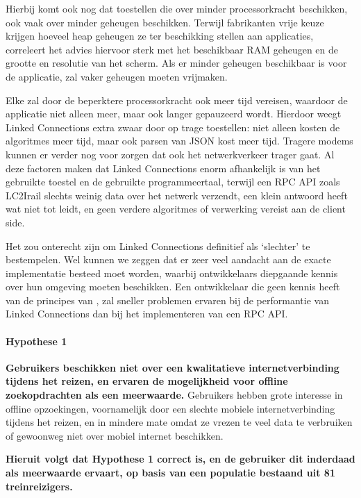 Hierbij komt ook nog dat toestellen die over minder processorkracht beschikken, ook vaak over minder geheugen beschikken. Terwijl fabrikanten vrije keuze krijgen hoeveel heap geheugen ze ter beschikking stellen aan applicaties, correleert het advies hiervoor sterk met het beschikbaar RAM geheugen en de grootte en resolutie van het scherm. Als er minder geheugen beschikbaar is voor de applicatie, zal  vaker geheugen moeten vrijmaken. 

Elke  zal door de beperktere processorkracht ook meer tijd vereisen, waardoor de applicatie niet alleen meer, maar ook langer gepauzeerd wordt. Hierdoor weegt Linked Connections extra zwaar door op trage toestellen: niet alleen kosten de algoritmes meer tijd, maar ook parsen van JSON kost meer tijd. Tragere modems kunnen er verder nog voor zorgen dat ook het netwerkverkeer trager gaat. Al deze factoren maken dat Linked Connections enorm afhankelijk is van het gebruikte toestel en de gebruikte programmeertaal, terwijl een RPC API zoals LC2Irail slechts weinig data over het netwerk verzendt, een klein antwoord heeft wat niet tot  leidt, en geen verdere algoritmes of verwerking vereist aan de client side. 

Het zou onterecht zijn om Linked Connections definitief als `slechter' te bestempelen. Wel kunnen we zeggen dat er zeer veel aandacht aan de exacte implementatie besteed moet worden, waarbij ontwikkelaars diepgaande kennis over hun omgeving moeten beschikken. Een ontwikkelaar die geen kennis heeft van de principes van , zal sneller problemen ervaren bij de performantie van Linked Connections dan bij het implementeren van een RPC API.

\paragraph{Hypothese 1} \textbf{Gebruikers beschikken niet over een kwalitatieve internetverbinding tijdens het reizen, en ervaren de mogelijkheid voor offline zoekopdrachten als een meerwaarde.}
	Gebruikers hebben grote interesse in offline opzoekingen, voornamelijk door een slechte mobiele internetverbinding tijdens het reizen, en in mindere mate omdat ze vrezen te veel data te verbruiken of gewoonweg niet over mobiel internet beschikken.
	
\textbf{Hieruit volgt dat Hypothese 1 correct is, en de gebruiker dit inderdaad als meerwaarde ervaart, op basis van een populatie bestaand uit 81 treinreizigers.}

